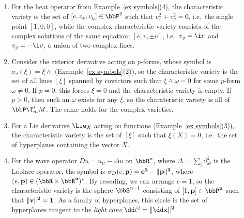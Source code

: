 \begin{example}
    \begin{enumerate}
        \item For the heat operator from Example~\ref{ex symbols}(4), the characteristic variety is the set of $[e,v_x,v_y]\in\bbP^2$ such that $v_x^2+v_y^2=0$, i.e.\ the single point $[1,0,0]$, while the complex characteristic variety consists of the complex solutions of the same equation: $[e,v,\pm v]$, i.e.\ $v_y=\i v$ and $v_y=-\i v$, a union of two complex lines.
        \item Consider the exterior derivative acting on $p$-forms, whose symbol is $\sigma_{\dd}(\xi)=\xi\wedge$ (Example~\ref{ex symbols}(2)), so the characteristic variety is the set of all lines $[\xi]$ spanned by covectors such that $\xi\wedge\omega=0$ for some $p$-form $\omega\neq 0$. If $p=0$, this forces $\xi=0$ and the characteristic variety is empty. If $p>0$, then such an $\omega$ exists for any $\xi$, so the charateristic variety is all of $\bbP \T^\ast_m M$. The same holds for the complex varieties.
        \item For a Lie derivative $\Lie_X$ acting on functions (Example~\ref{ex symbols}(3)), the characteristic variety is the set of $[\xi]$ such that $\xi(X)=0$, i.e.\ the set of hyperplanes containing the vector $X$.
        \item For the wave operator $Du=u_{tt}-\Delta u$ on $\bbR^n$, where $\Delta=\sum_i \partial_{x^i}^2$ is the Laplace operator, the symbol is $\sigma_D(e,\bf{p})=e^2-\lVert\bf{p}\rVert^2$, where $(e,\bf{p})\in (\bbR\times\bbR^n)^\ast$. By rescaling, we can arrange $e=1$, so the characteristic variety is the sphere $\bbS^{n-1}$ consisting of $[1,\bf{p}]\in \bbP^n$ such that $\lVert\bf{v}\rVert^2=1$. As a family of hyperplanes, this circle is the set of hyperplanes tangent to the \emph{light cone} $\dd t^2=\lVert\dd \bf{x}\rVert^2$.
    \end{enumerate}
\end{example}


